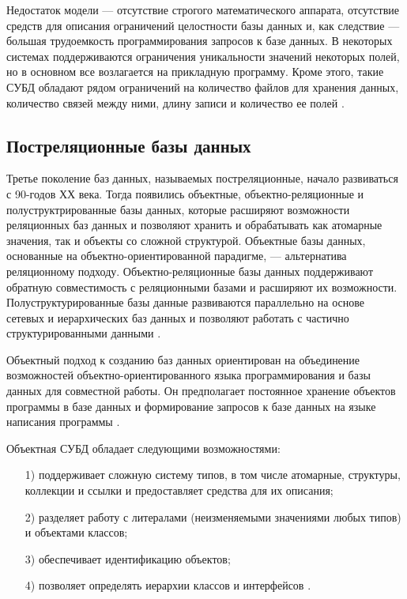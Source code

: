 \documentclass{bmstu}
\begin{document}
Недостаток модели --- отсутствие строгого математического аппарата, отсутствие средств для описания ограничений целостности базы данных и, как следствие --- большая трудоемкость программирования запросов к базе данных. 
В некоторых системах поддерживаются ограничения уникальности значений некоторых полей, но в основном все возлагается на
прикладную программу. 
Кроме этого, такие СУБД обладают рядом ограничений на количество файлов для хранения данных, количество
связей между ними, длину записи и количество ее полей \cite{Avrunev2018}.

\subsection{Постреляционные базы данных}

Третье поколение баз данных, называемых постреляционные, начало развиваться с 90-годов ХХ века. 
Тогда появились объектные, объектно-реляционные и полуструктрированные базы данных, которые расширяют возможности реляционных баз данных и позволяют хранить и обрабатывать как атомарные значения, так и объекты со сложной структурой. 
Объектные базы данных, основанные на объектно-ориентированной парадигме, --- альтернатива реляционному подходу. 
Объектно-реляционные базы данных поддерживают обратную совместимость с реляционными базами и расширяют их
возможности. 
Полуструктурированные базы данные развиваются параллельно на основе сетевых и иерархических баз данных и позволяют работать с частично структурированными данными \cite{Vinogradov2016}.

Объектный подход к созданию баз данных ориентирован на объединение возможностей объектно-ориентированного языка программирования и базы данных для совместной работы. 
Он предполагает постоянное хранение объектов программы в базе данных и формирование запросов к базе данных на языке написания программы \cite{Vinogradov2016}.

Объектная СУБД обладает следующими возможностями:
\begin{enumerate}
\item[1)] поддерживает сложную систему типов, в том числе атомарные, структуры, коллекции и ссылки и предоставляет средства для их описания;
\item[2)] разделяет работу с литералами (неизменяемыми значениями любых типов) и объектами классов;
\item[3)] обеспечивает идентификацию объектов;
\item[4)] позволяет определять иерархии классов и интерфейсов \cite{Vinogradov2016}.
\end{enumerate}
\end{document}
